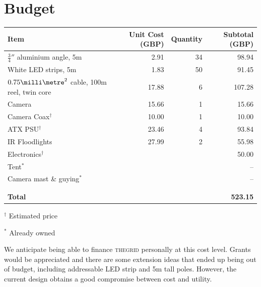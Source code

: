 \documentclass[12pt]{article} %
\newcommand{\thegrid}{\textsc{the\textperiodcentered grid}\xspace}
\begin{document}
\clearpage
\section{Budget}

\begin{table}[ht]
    \centering
    \begin{tabular}{l|r|r|r}
        Item & Unit Cost (GBP) & Quantity & Subtotal (GBP) \\
        \hline
        $\frac{3}{4}''$ aluminium angle, 5m & 2.91 & 34 & 98.94\\
                 White LED strips, 5m & 1.83 & 50 & 91.45\\
$0.75\milli\metre^2$ cable, 100m reel, twin core & 17.88 & 6 & 107.28\\
                               Camera & 15.66 & 1 & 15.66\\
                               Camera Coax$^\dagger$ & 10.00 & 1 & 10.00\\
                              ATX PSU$^\dagger$ & 23.46 & 4 & 93.84\\
                       IR Floodlights & 27.99 & 2 & 55.98\\
                          Electronics$^\dagger$ & & & 50.00\\
                    Tent$^\ast$ & & & --\\
                   Camera mast \& guying$^\ast$ & & & --\\

                                &&&\\
                                &&&\\

                 \textbf{Total} & & & \textbf{523.15}\\

    \end{tabular}
\end{table}

$^\dagger$ Estimated price

$^\ast$ Already owned

\vspace{2cm}

We anticipate being able to finance \thegrid personally at this cost level.
Grants would be appreciated and there are some extension ideas that ended up
being out of budget, including addressable LED strip and 5m tall poles.
However, the current design obtains a good compromise between cost and utility.
\end{document}
